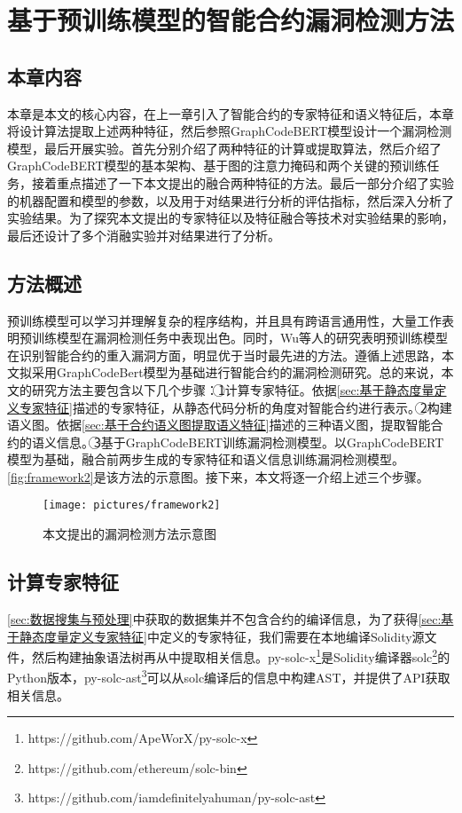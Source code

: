 \chapter{基于预训练模型的智能合约漏洞检测方法}
\section{本章内容}
\label{sec:本章内容4}
本章是本文的核心内容，在上一章引入了智能合约的专家特征和语义特征后，本章将设计算法提取上述两种特征，然后参照GraphCodeBERT模型设计一个漏洞检测模型，最后开展实验。首先分别介绍了两种特征的计算或提取算法，然后介绍了GraphCodeBERT模型的基本架构、基于图的注意力掩码和两个关键的预训练任务，接着重点描述了一下本文提出的融合两种特征的方法。最后一部分介绍了实验的机器配置和模型的参数，以及用于对结果进行分析的评估指标，然后深入分析了实验结果。为了探究本文提出的专家特征以及特征融合等技术对实验结果的影响，最后还设计了多个消融实验并对结果进行了分析。
\section{方法概述}
\label{sec:方法概述}
预训练模型可以学习并理解复杂的程序结构，并且具有跨语言通用性，大量工作表明预训练模型在漏洞检测任务中表现出色\cite{pretrained_is_good_1,pretrained_is_good_2,pretrained_is_good_3}。同时，Wu等人的研究表明预训练模型在识别智能合约的重入漏洞方面，明显优于当时最先进的方法\cite{wu2021peculiar}。遵循上述思路，本文拟采用GraphCodeBert模型为基础进行智能合约的漏洞检测研究。总的来说，本文的研究方法主要包含以下几个步骤：\textcircled{1}计算专家特征。依据\autoref{sec:基于静态度量定义专家特征}描述的专家特征，从静态代码分析的角度对智能合约进行表示。\textcircled{2}构建语义图。依据\autoref{sec:基于合约语义图提取语义特征}描述的三种语义图，提取智能合约的语义信息。\textcircled{3}基于GraphCodeBERT训练漏洞检测模型。以GraphCodeBERT模型为基础，融合前两步生成的专家特征和语义信息训练漏洞检测模型。\autoref{fig:framework2}是该方法的示意图。接下来，本文将逐一介绍上述三个步骤。
\begin{figure}[htbp]
    \centering
    \texttt{[image: pictures/framework2]}
    \caption{\label{fig:framework2}本文提出的漏洞检测方法示意图}
\end{figure}

\section{计算专家特征}
\label{sec:计算专家特征}
\autoref{sec:数据搜集与预处理}中获取的数据集并不包含合约的编译信息，为了获得\autoref{sec:基于静态度量定义专家特征}中定义的专家特征，我们需要在本地编译Solidity源文件，然后构建抽象语法树再从中提取相关信息。py-solc-x\footnote{https://github.com/ApeWorX/py-solc-x}是Solidity编译器solc\footnote{https://github.com/ethereum/solc-bin}的Python版本，py-solc-ast\footnote{https://github.com/iamdefinitelyahuman/py-solc-ast}可以从solc编译后的信息中构建AST，并提供了API获取相关信息。


